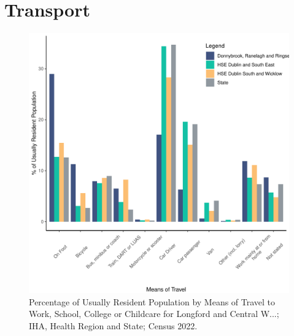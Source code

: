 \documentclass{article}
\begin{document}
\section{Transport}\label{sect:Trans}
\begin{figure}[H]
	\centering
	\includegraphics[width = 120mm]{../figures/TravelED.pdf}
	\caption{Percentage of Usually Resident Population by Means of Travel to Work, School, College or Childcare for Longford and Central W...; IHA, Health Region and State; Census 2022.}
	\label{fig:vbnv}
	\end{figure}
\end{document}
